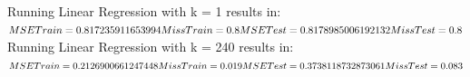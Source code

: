 \documentclass[a4paper]{article}
\begin{document}
\begin{multicols}{2}

Running Linear Regression with k = 1 results in: \\

$MSE Train = 0.817235911653994 \\ Miss Train = 0.8 \\ MSE Test = 0.8178985006192132 \\ Miss Test = 0.8$ \\

Running Linear Regression with k = 240 results in: \\

$MSE Train = 0.2126900661247448 \\ Miss Train = 0.019 \\ MSE Test = 0.3738118732873061 \\ Miss Test = 0.083$
\\

\end{multicols}
\end{document}
